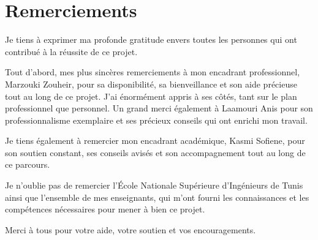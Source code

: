 \chapter*{Remerciements}
\thispagestyle{MyStyle}


Je tiens à exprimer ma profonde gratitude envers toutes les personnes qui ont contribué à la réussite de ce projet.\par

\vspace{0.3cm}

\noindent Tout d’abord, mes plus sincères remerciements à mon encadrant professionnel, Marzouki Zouheir, pour sa disponibilité, sa bienveillance et son aide précieuse tout au long de ce projet. J’ai énormément appris à ses côtés, tant sur le plan professionnel que personnel. Un grand merci également à Laamouri Anis pour son professionnalisme exemplaire et ses précieux conseils qui ont enrichi mon travail.\par


\vspace{0.3cm}

\noindent Je tiens également à remercier mon encadrant académique, Kasmi Sofiene, pour son soutien constant, ses conseils avisés et son accompagnement tout au long de ce parcours.\par

\vspace{0.3cm}

\noindent Je n’oublie pas de remercier l’École Nationale Supérieure d’Ingénieurs de Tunis ainsi que l’ensemble de mes enseignants, qui m’ont fourni les connaissances et les compétences nécessaires pour mener à bien ce projet.\par

\vspace{0.3cm}
\noindent Merci à tous pour votre aide, votre soutien et vos encouragements.\par
